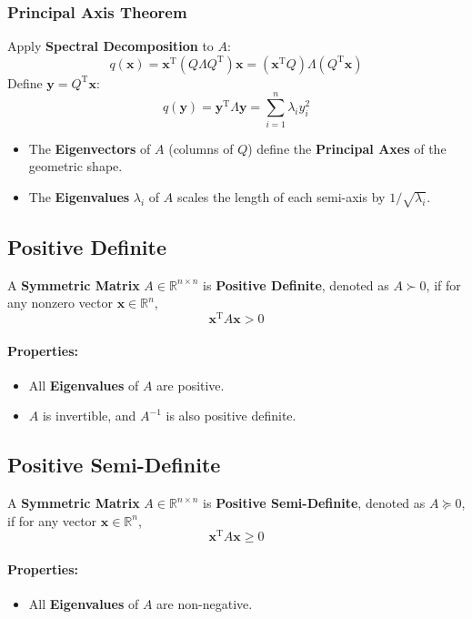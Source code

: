 \documentclass{article}
\begin{document}
\subsubsection{Principal Axis Theorem}
Apply \textbf{Spectral Decomposition} to $A$:
\[
    q(\mathbf{x}) = \mathbf{x}^{\mathrm{T}} (Q \Lambda Q^{\mathrm{T}}) \mathbf{x} = (\mathbf{x}^{\mathrm{T}} Q) \Lambda (Q^{\mathrm{T}} \mathbf{x})
\]
Define $\mathbf{y} = Q^{\mathrm{T}} \mathbf{x}$:
\[
    q(\mathbf{y}) = \mathbf{y}^{\mathrm{T}} \Lambda \mathbf{y} = \sum_{i=1}^n \lambda_i y_i^2
\]
\begin{itemize}
    \item The \textbf{Eigenvectors} of $A$ (columns of $Q$) define the \textbf{Principal Axes} of the geometric shape.
    \item The \textbf{Eigenvalues} $\lambda_i$ of $A$ scales the length of each semi-axis by $1/\sqrt{\lambda_i}$.
\end{itemize}

\subsection{Positive Definite}
A \textbf{Symmetric Matrix} $A \in \mathbb{R}^{n \times n}$ is \textbf{Positive Definite}, denoted as $A \succ 0$, if for any nonzero vector $\mathbf{x} \in \mathbb{R}^n$,
\[
    \mathbf{x}^{\mathrm{T}} A \mathbf{x} > 0
\]
\paragraph{Properties:}
\begin{itemize}
    \item All \textbf{Eigenvalues} of $A$ are positive.
    \item $A$ is invertible, and $A^{-1}$ is also positive definite.
\end{itemize}

\subsection{Positive Semi-Definite}
A \textbf{Symmetric Matrix} $A \in \mathbb{R}^{n \times n}$ is \textbf{Positive Semi-Definite}, denoted as $A \succeq 0$, if for any vector $\mathbf{x} \in \mathbb{R}^n$,
\[
    \mathbf{x}^{\mathrm{T}} A \mathbf{x} \geq 0
\]
\paragraph{Properties:}
\begin{itemize}
    \item All \textbf{Eigenvalues} of $A$ are non-negative.
\end{itemize}
\end{document}
